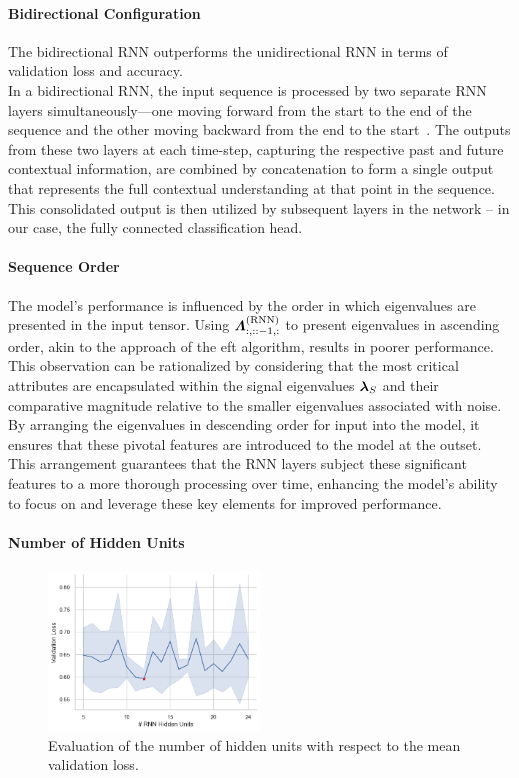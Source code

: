 \paragraph{Bidirectional Configuration}
The bidirectional RNN outperforms the unidirectional RNN in terms of validation loss and accuracy. \\
In a bidirectional RNN, the input sequence is processed by two separate RNN layers simultaneously—one moving
forward from the start to the end of the sequence and the other moving backward from the end to the start~\cite[Chapter 10.3]{dlbook}.
The outputs from these two layers at each time-step, capturing the respective past and future contextual information,
are combined by concatenation to form a single output that represents the full contextual understanding at
that point in the sequence.
This consolidated output is then utilized by subsequent layers in the network -- in our case, the fully connected classification head.


\paragraph{Sequence Order}
The model's performance is influenced by the order in which eigenvalues are presented in the input tensor.
Using \( \boldsymbol{\varLambda}^{(\text{RNN})}_{:,::-1,:} \) to present eigenvalues in ascending order, akin to the approach of the \gls{eft} algorithm,
results in poorer performance. \\
This observation can be rationalized by considering that the most critical attributes are encapsulated within the signal
eigenvalues \( \boldsymbol{\lambda}_{S} \) and their comparative magnitude relative to the smaller eigenvalues associated with noise.
By arranging the eigenvalues in descending order for input into the model, it ensures that these pivotal features are
introduced to the model at the outset. This arrangement guarantees that the RNN layers subject these significant features
to a more thorough processing over time, enhancing the model's ability to focus on and leverage these key elements for
improved performance.


\paragraph{Number of Hidden Units}
\begin{figure}[H]
    \centering
    \includegraphics[width=0.5\textwidth]{figures/06_ModelExploration/RNN/rnn_num_hidden.png}
    \caption{Evaluation of the number of hidden units with respect to the mean validation loss.}
    \label{fig:rnn_hidden_units}
\end{figure}


